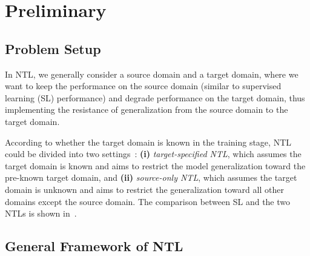 \section{Preliminary}
\label{sec:Preliminary}

\subsection{Problem Setup}

In NTL, we generally consider a source domain and a target domain, where we want to keep the performance on the source domain (similar to supervised learning (SL) performance) and degrade performance on the target domain, thus implementing the resistance of generalization from the source domain to the target domain.

According to whether the target domain is known in the training stage, NTL could be divided into two settings~\cite{wang2021non}: \textbf{(i)} \textit{target-speciﬁed NTL}, which assumes the target domain is known and aims to restrict the model generalization toward the pre-known target domain, and \textbf{(ii)} \textit{source-only NTL}, which assumes the target domain is unknown and aims to restrict the generalization toward all other domains except the source domain. The comparison between SL and the two NTLs is shown in~.


\subsection{General Framework of NTL}
\label{sec:definition}

